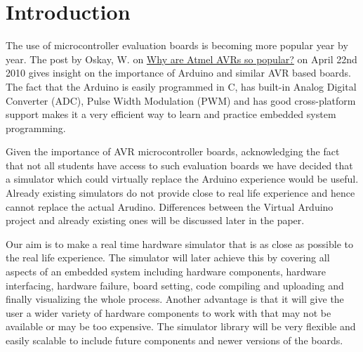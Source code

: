 \chapter{Introduction}
\label{chap:intro}



The use of microcontroller evaluation boards is becoming more popular year by year. The post by Oskay, W. on \href{http://electronics.stackexchange.com/questions/2324/why-are-atmel-avrs-so-popular}{Why are Atmel AVRs so popular?} on April 22nd 2010 gives insight on the importance of Arduino and similar AVR based boards. The fact that the Arduino is easily programmed in C, has built-in Analog Digital Converter (ADC), Pulse Width Modulation (PWM) and has good cross-platform support makes it a very efficient way to learn and practice embedded system programming.

Given the importance of AVR microcontroller boards, acknowledging the fact that not all students have access to such evaluation boards we have decided that a simulator which could virtually replace the Arduino experience would be useful. Already existing simulators do not provide close to real life experience and hence cannot replace the actual Arudino. Differences between the Virtual Arduino project and already existing ones will be discussed later in the paper.

Our aim is to make a real time hardware simulator that is as close as possible to the real life experience. The simulator will later achieve this by covering all aspects of an embedded system including hardware components, hardware interfacing, hardware failure, board setting, code compiling and uploading and finally visualizing the whole process. Another advantage is that it will give the user a wider variety of hardware components to work with that may not be available or may be too expensive. The simulator library will be very flexible and easily scalable to include future components and newer versions of the boards.
\clearpage

